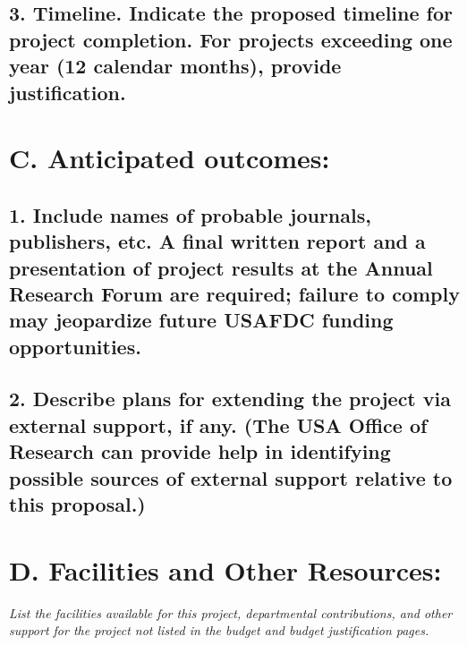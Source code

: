 \documentclass[11pt]{article}
\begin{document}
\subsection*{3. Timeline.  Indicate the proposed timeline for project completion. For projects exceeding one year (12 calendar months), provide justification.}














\section*{C. Anticipated outcomes:}

\subsection*{1. Include names of probable journals, publishers, etc.  A final written report and a presentation of project results at the Annual Research Forum are required; failure to comply may jeopardize future USAFDC funding opportunities.}











\subsection*{2.	Describe plans for extending the project via external support, if any. (The USA Office of Research can provide help in identifying possible sources of external support relative to this proposal.)}
















\section*{D.	Facilities and Other Resources:}

\textit{List the facilities available for this project, departmental contributions, and other support for the project not listed in the budget and budget justification pages.}
\end{document}

